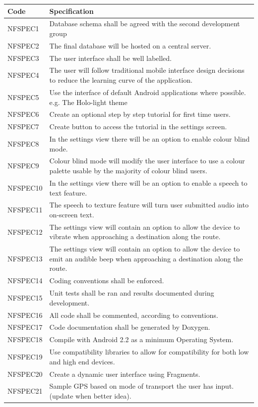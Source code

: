 \documentclass[11pt,a4paper]{article}
\begin{document}
\begin{longtable}{|p{2.5cm}p{13cm}|}
\hline
\textbf{Code} & \textbf{Specification} \\

\hline
NFSPEC1 & Database schema shall be agreed with the second development group \\ \hline
NFSPEC2 & The final database will be hosted on a central server. \\ \hline
NFSPEC3 & The user interface shall be well labelled. \\ \hline
NFSPEC4 & The user will follow traditional mobile interface design decisions to reduce the learning curve of the application. \\ \hline
NFSPEC5 & Use the interface of default Android applications where possible. e.g. The Holo-light theme \\ \hline
NFSPEC6 & Create an optional step by step tutorial for first time users. \\ \hline
NFSPEC7 & Create button to access the tutorial in the settings screen. \\ \hline
NFSPEC8 & In the settings view there will be an option to enable colour blind mode. \\ \hline
NFSPEC9 & Colour blind mode will modify the user interface to use a colour palette usable by the majority of colour blind users. \\ \hline
NFSPEC10 & In the settings view there will be an option to enable a speech to text feature. \\ \hline
NFSPEC11 & The speech to texture feature will turn user submitted audio into on-screen text. \\ \hline
NFSPEC12 & The settings view will contain an option to allow the device to vibrate when approaching a destination along the route. \\ \hline
NFSPEC13 & The settings view will contain an option to allow the device to emit an audible beep when approaching a destination along the route. \\ \hline
NFSPEC14 & Coding conventions shall be enforced. \\ \hline
NFSPEC15 & Unit tests shall be ran and results documented during development. \\ \hline
NFSPEC16 & All code shall be commented, according to conventions. \\ \hline
NFSPEC17 & Code documentation shall be generated by Doxygen. \\ \hline
NFSPEC18 & Compile with Android 2.2 as a minimum Operating System. \\ \hline
NFSPEC19 & Use compatibility libraries to allow for compatibility for both low and high end devices. \\ \hline
NFSPEC20 & Create a dynamic user interface using Fragments. \\ \hline
NFSPEC21 & Sample GPS based on mode of transport the user has input. (update when better idea). \\ \hline
\end{longtable}
\end{document}
